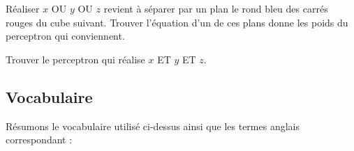 \documentclass[11pt,class=report,crop=false]{standalone}
\begin{document}
\begin{exemple}
Réaliser \og{}$x$ OU $y$ OU $z$\fg{} revient à séparer par un plan le rond bleu des carrés rouges du cube suivant. Trouver l'équation d'un de ces plans donne les poids du perceptron qui conviennent. 

\begin{center}
\begin{minipage}{0.60\textwidth}
\end{minipage}
\begin{minipage}{0.39\textwidth}
\end{minipage}
\end{center}

\end{exemple}

\begin{exercicecours}
Trouver le perceptron qui réalise  \og{}$x$ ET $y$ ET $z$\fg{}.

\end{exercicecours}




\subsection{Vocabulaire}

Résumons le vocabulaire utilisé ci-dessus ainsi que les termes anglais correspondant :
\end{document}
